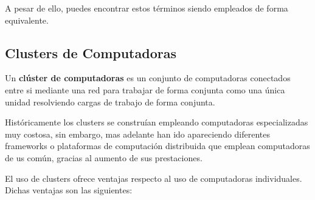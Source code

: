 A pesar de ello, puedes encontrar estos términos siendo empleados de forma equivalente.

\subsection{Clusters de Computadoras}
Un \textbf{clúster de computadoras} es un conjunto de computadoras conectados entre si mediante una red para trabajar de forma conjunta como una única unidad resolviendo cargas de trabajo de forma conjunta. 

Históricamente los clusters se construían empleando computadoras especializadas muy costosa, sin embargo, mas adelante han ido apareciendo diferentes frameworks o plataformas de computación distribuida que emplean computadoras de us común, gracias al aumento de sus prestaciones.

El uso de clusters ofrece ventajas respecto al uso de computadoras individuales. Dichas ventajas son las siguientes:


